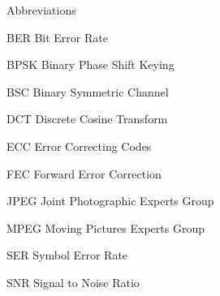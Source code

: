 
\begin{dictionary}{Abbreviations}
\item[BER]	Bit Error Rate
\item[BPSK]	Binary Phase Shift Keying
\item[BSC]	Binary Symmetric Channel
\item[DCT]	Discrete Cosine Transform
\item[ECC]	Error Correcting Codes
\item[FEC]	Forward Error Correction
\item[JPEG]	Joint Photographic Experts Group
\item[MPEG]	Moving Pictures Experts Group
\item[SER]	Symbol Error Rate
\item[SNR]	Signal to Noise Ratio
\end{dictionary}
